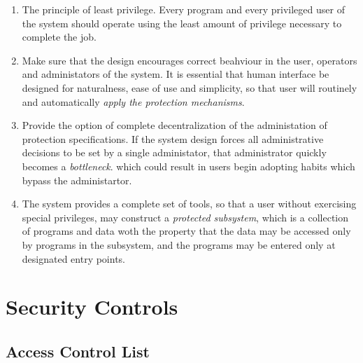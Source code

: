 \begin{enumerate}
     \item The principle of least privilege. Every program and every privileged user of the system 
     should operate using the least amount of privilege necessary to complete the job.

     \item Make sure that the design encourages correct beahviour in the user, operators and 
     administators of the system. It is essential that human interface be designed for naturalness, 
     ease of use and simplicity, so that user will routinely and automatically \textit{apply the 
     protection mechanisms}.

     \item Provide the option of complete decentralization of the administation of protection 
     specifications. If the system design forces all administrative decisions to be set by a single 
     administator, that administrator quickly becomes a \textit{bottleneck}. which could result in users 
     begin adopting habits which bypass the administartor.

     \item The system provides a complete set of tools, so that a user without exercising special 
     privileges, may construct a \textit{protected subsystem}, which is a collection of programs 
     and data woth the property that the data may be accessed only by programs in the subsystem, and 
     the programs may be entered only at designated entry points.
\end{enumerate}


\section{Security Controls}


\subsection{Access Control List}

